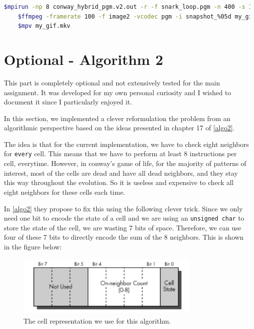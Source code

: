 \documentclass{report}
\begin{document}
\begin{lstlisting}[language=bash]
    $mpirun -np 8 conway_hybrid_pgm.v2.out -r -f snark_loop.pgm -n 400 -s 1 -e 1 
    $ffmpeg -framerate 100 -f image2 -vcodec pgm -i snapshot_%05d my_gif.mkv
    $mpv my_gif.mkv
\end{lstlisting}

\section{Optional - Algorithm 2}

This part is completely optional and not extensively tested for the main 
assignment. It was developed for my own personal curiosity and I wished to 
document it since I particularly enjoyed it. 

In this section, we implemented a clever reformulation the problem from an 
algorithmic perspective based on the ideas presented in chapter 17 of 
\ref{algo2}. 

The idea is that for the current implementation, we have to check eight neighbors 
for \texttt{every} cell. This means that we have to perform at least 8 instructions 
per cell, everytime. However, in conway's game of life, for the majority of 
patterns of interest, most of the cells are dead and have all dead neighbors, 
and they stay this way throughout the evolution. So it is useless and expensive
to check all eight neighbors for these cells each time.

In \ref{algo2} they propose to fix this using the following clever trick. 
Since we only need one bit to encode the state of a cell and we are using an 
\texttt{unsigned char} to store the state of the cell, we are wasting 7 bits 
of space. Therefore, we can use four of these 7 bits to directly encode the 
sum of the 8 neighbors. This is shown in the figure below:

\begin{figure}[H]
    \centering
    \includegraphics[width=9cm, height=3cm]{./other_images/new_cell_rep.png}
    \caption{\label{fig:mpi_multiple} The cell representation we use for this 
    algorithm. }
\end{figure}
\end{document}
